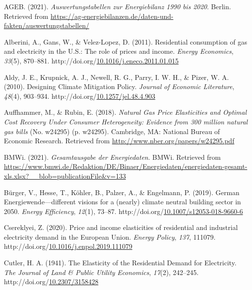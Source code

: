 \documentclass[12pt,twoside]{reedthesis}
\newlength{\cslhangindent}
\newenvironment{CSLReferences}[2] %
 {%
  \setlength{\parindent}{0pt}
  \ifodd #1 \everypar{\setlength{\hangindent}{\cslhangindent}}\ignorespaces\fi
  \ifnum #2 > 0
  \setlength{\parskip}{#2\baselineskip}
  \fi
 }%
 {}
\begin{document}
\hypertarget{refs}{}
\begin{CSLReferences}{1}{0}
\leavevmode{}%
AGEB. (2021). \emph{Auswertungstabellen zur Energiebilanz 1990 bis 2020}. Berlin. Retrieved from \url{https://ag-energiebilanzen.de/daten-und-fakten/auswertungstabellen/}

\leavevmode{}%
Alberini, A., Gans, W., \& Velez-Lopez, D. (2011). Residential consumption of gas and electricity in the U.S.: The role of prices and income. \emph{Energy Economics}, \emph{33}(5), 870--881. http://doi.org/\href{https://doi.org/10.1016/j.eneco.2011.01.015}{10.1016/j.eneco.2011.01.015}

\leavevmode{}%
Aldy, J. E., Krupnick, A. J., Newell, R. G., Parry, I. W. H., \& Pizer, W. A. (2010). Designing Climate Mitigation Policy. \emph{Journal of Economic Literature}, \emph{48}(4), 903--934. http://doi.org/\href{https://doi.org/10.1257/jel.48.4.903}{10.1257/jel.48.4.903}

\leavevmode{}%
Auffhammer, M., \& Rubin, E. (2018). \emph{Natural Gas Price Elasticities and Optimal Cost Recovery Under Consumer Heterogeneity: Evidence from 300 million natural gas bills} (No. w24295) (p. w24295). Cambridge, MA: National Bureau of Economic Research. Retrieved from \url{http://www.nber.org/papers/w24295.pdf}

\leavevmode{}%
BMWi. (2021). \emph{Gesamtausgabe der Energiedaten}. BMWi. Retrieved from \url{https://www.bmwi.de/Redaktion/DE/Binaer/Energiedaten/energiedaten-gesamt-xls.xlsx?__blob=publicationFile\&v=133}

\leavevmode{}%
Bürger, V., Hesse, T., Köhler, B., Palzer, A., \& Engelmann, P. (2019). German Energiewende---different visions for a (nearly) climate neutral building sector in 2050. \emph{Energy Efficiency}, \emph{12}(1), 73--87. http://doi.org/\href{https://doi.org/10.1007/s12053-018-9660-6}{10.1007/s12053-018-9660-6}

\leavevmode{}%
Csereklyei, Z. (2020). Price and income elasticities of residential and industrial electricity demand in the European Union. \emph{Energy Policy}, \emph{137}, 111079. http://doi.org/\href{https://doi.org/10.1016/j.enpol.2019.111079}{10.1016/j.enpol.2019.111079}

\leavevmode{}%
Cutler, H. A. (1941). The Elasticity of the Residential Demand for Electricity. \emph{The Journal of Land \& Public Utility Economics}, \emph{17}(2), 242--245. http://doi.org/\href{https://doi.org/10.2307/3158428}{10.2307/3158428}


\end{CSLReferences}
\end{document}
